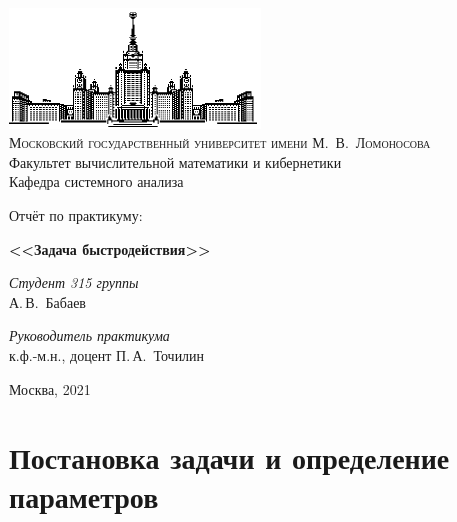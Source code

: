 \documentclass[11pt]{article}
\begin{document}
	
	\thispagestyle{empty}
	
	\begin{center}
		\ \vspace{-3cm}
		
		\includegraphics[width=0.5\textwidth]{msu.eps}\\
		{\scshape Московский государственный университет имени М.~В.~Ломоносова}\\
		Факультет вычислительной математики и кибернетики\\
		Кафедра системного анализа
		
		\vfill
		
		{\LARGE Отчёт по  практикуму:}
		
		\vspace{1cm}
		
		{\Huge\bfseries <<Задача быстродействия>>}
	\end{center}
	
	\vspace{1cm}
	
	\begin{flushright}
		\large
		\textit{Студент 315 группы}\\
		А.\,В.~Бабаев
		
		\vspace{5mm}
		
		\textit{Руководитель практикума}\\
		к.ф.-м.н., доцент П.\,А.~Точилин
	\end{flushright}
	
	\vfill
	
	\begin{center}
		Москва, 2021
	\end{center}
	
	\newpage
	\tableofcontents
	\newpage
	
	{\vspace*{-2cm} \hspace*{-1cm}\section{Постановка задачи и определение параметров}}
\end{document}
